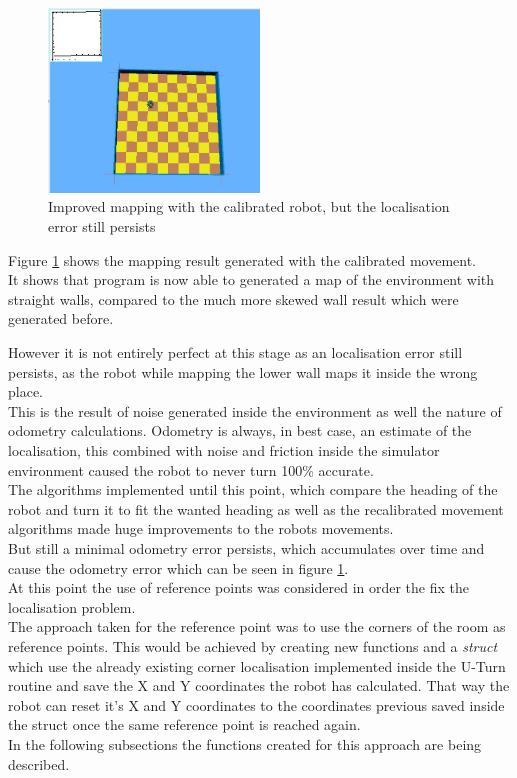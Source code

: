 \begin{figure}[h]
\centering
\includegraphics[width = 0.5\textwidth]{../../figures/odometry_error}
\caption{Improved mapping with the calibrated robot, but the localisation error still persists}
\label{odometry_error}
\end{figure}

Figure \ref{odometry_error} shows the mapping result generated with the calibrated movement.\\
It shows that program is now able to generated a map of the environment with straight walls, compared to the much more skewed wall result which were generated before.

However it is not entirely perfect at this stage as an localisation error still persists, as the robot while mapping the lower wall maps it inside the wrong place. \\
This is the result of noise generated inside the environment as well the nature of odometry calculations.
Odometry is always, in best case, an estimate of the localisation, this combined with noise and friction inside the simulator environment caused the robot to never turn 100\% accurate. \\
The algorithms implemented until this point, which compare the heading of the robot and turn it to fit the wanted heading as well as the recalibrated movement algorithms made huge improvements to the robots movements.\\
But still a minimal odometry error persists, which accumulates over time and cause the odometry error which can be seen in figure \ref{odometry_error}. \\[3ex]

At this point the use of reference points was considered in order the fix the localisation problem.\\
The approach taken for the reference point was to use the corners of the room as reference points.
This would be achieved by creating new functions and a \textit{struct }which use the already existing corner localisation implemented inside the U-Turn routine and save the X and Y coordinates the robot has calculated.
That way the robot can reset it's X and Y coordinates to the coordinates previous saved inside the struct once the same reference point is reached again.\\
In the following subsections the functions created for this approach are being described.

